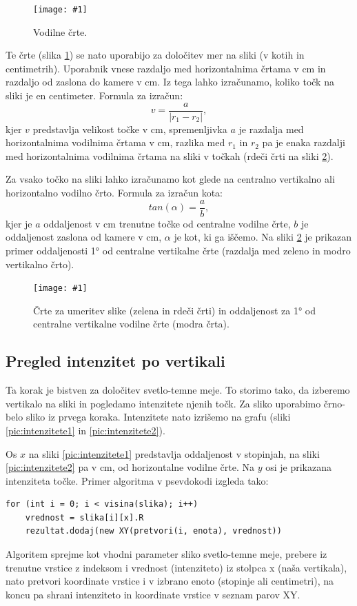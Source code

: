 \documentclass[oneside, a4paper, 12pt]{book}
\newcommand{\slika}[3]{
	\begin{figure}
	\begin{center}
	\texttt{[image: \#1]}
	\end{center}
	\vspace{-20pt}
	\caption{#2}
	\label{#3}
	\end{figure}
}
\begin{document}
\slika{slike/vodilne-crte.jpg}{Vodilne črte.}{pic:vodilne-crte}

Te črte (slika \ref{pic:vodilne-crte}) se nato uporabijo za določitev 
mer na sliki (v kotih in centimetrih). Uporabnik vnese razdaljo med 
horizontalnima črtama v cm in razdaljo od zaslona do kamere v cm. Iz 
tega lahko izračunamo, koliko točk na sliki je en centimeter. Formula 
za izračun:
\begin{equation}
v=\dfrac{a}{|r_1-r_2|},
\end{equation}
kjer $v$ predstavlja velikost točke v cm, spremenljivka $a$ je razdalja 
med horizontalnima vodilnima črtama v cm, razlika med $r_1$ in $r_2$ pa 
je enaka razdalji med horizontalnima vodilnima črtama na sliki v točkah 
(rdeči črti na sliki \ref{pic:vodilne-mere}). 

Za vsako točko na sliki lahko izračunamo kot glede na centralno 
vertikalno ali horizontalno vodilno črto. Formula za izračun kota:
\begin{equation}
tan(\alpha)=\dfrac{a}{b},
\end{equation}
kjer je $a$ oddaljenost v cm trenutne točke od centralne vodilne 
črte, $b$ je oddaljenost zaslona od kamere v cm, $\alpha$ je kot, 
ki ga iščemo. Na sliki \ref{pic:vodilne-mere} je prikazan primer 
oddaljenosti 1° od centralne vertikalne črte (razdalja med zeleno 
in modro vertikalno črto).

\slika{slike/vodilne-mere.jpg}{Črte za umeritev slike (zelena in 
rdeči črti) in oddaljenost za 1° od centralne vertikalne vodilne 
črte (modra črta).}{pic:vodilne-mere}

\subsection{Pregled intenzitet po vertikali}
Ta korak je bistven za določitev svetlo-temne meje. To storimo tako, 
da izberemo vertikalo na sliki in pogledamo intenzitete njenih točk. 
Za sliko uporabimo črno-belo sliko iz prvega koraka. Intenzitete nato 
izrišemo na grafu (sliki \ref{pic:intenzitete1} in \ref{pic:intenzitete2}).

Os $x$ na sliki \ref{pic:intenzitete1} predstavlja oddaljenost v 
stopinjah, na sliki \ref{pic:intenzitete2} pa v cm, od horizontalne 
vodilne črte. Na $y$ osi je prikazana intenziteta točke. Primer 
algoritma v psevdokodi izgleda tako:
\begin{samepage}
\begin{verbatim}
for (int i = 0; i < visina(slika); i++)
    vrednost = slika[i][x].R
    rezultat.dodaj(new XY(pretvori(i, enota), vrednost))
\end{verbatim}
\end{samepage}
Algoritem sprejme kot vhodni parameter sliko svetlo-temne meje, 
prebere iz trenutne vrstice z indeksom i vrednost (intenziteto) 
iz stolpca x (naša vertikala), nato pretvori koordinate vrstice i 
v izbrano enoto (stopinje ali centimetri), na koncu pa shrani 
intenziteto in koordinate vrstice v seznam parov XY.
\end{document}
